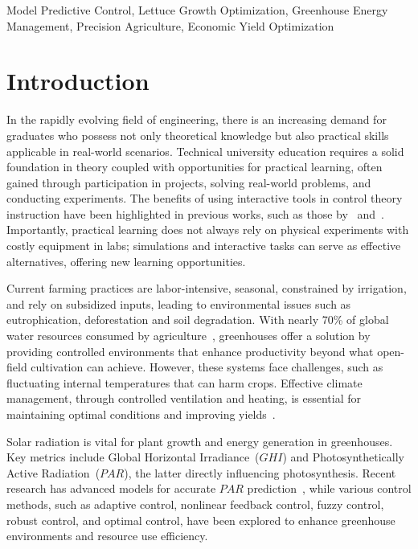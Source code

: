 \documentclass[conference]{IEEEtran}
\begin{document}
\begin{IEEEkeywords}
    Model Predictive Control, Lettuce Growth Optimization, Greenhouse Energy Management, Precision Agriculture, Economic Yield Optimization
\end{IEEEkeywords}

\section{Introduction}

In the rapidly evolving field of engineering, there is an increasing demand for graduates who possess not only theoretical knowledge but also practical skills applicable in real-world scenarios. Technical university education requires a solid foundation in theory coupled with opportunities for practical learning, often gained through participation in projects, solving real-world problems, and conducting experiments. The benefits of using interactive tools in control theory instruction have been highlighted in previous works, such as those by~\cite{Emami1991} and~\cite{Guzman2013}. Importantly, practical learning does not always rely on physical experiments with costly equipment in labs; simulations and interactive tasks can serve as effective alternatives, offering new learning opportunities.

Current farming practices are labor-intensive, seasonal, constrained by irrigation, and rely on subsidized inputs, leading to environmental issues such as eutrophication, deforestation and soil degradation. With nearly 70\% of global water resources consumed by agriculture~\cite{Debroy2024}, greenhouses offer a solution by providing controlled environments that enhance productivity beyond what open-field cultivation can achieve. However, these systems face challenges, such as fluctuating internal temperatures that can harm crops. Effective climate management, through controlled ventilation and heating, is essential for maintaining optimal conditions and improving yields~\cite{Wu2019}.

Solar radiation is vital for plant growth and energy generation in greenhouses. Key metrics include Global Horizontal Irradiance~(\(GHI\)) and Photosynthetically Active Radiation~(\(PAR\)), the latter directly influencing photosynthesis. Recent research has advanced models for accurate \(PAR\) prediction~\cite{Iddio2020, MaLu2022}, while various control methods, such as adaptive control, nonlinear feedback control, fuzzy control, robust control, and optimal control, have been explored to enhance greenhouse environments and resource use efficiency.
\end{document}
